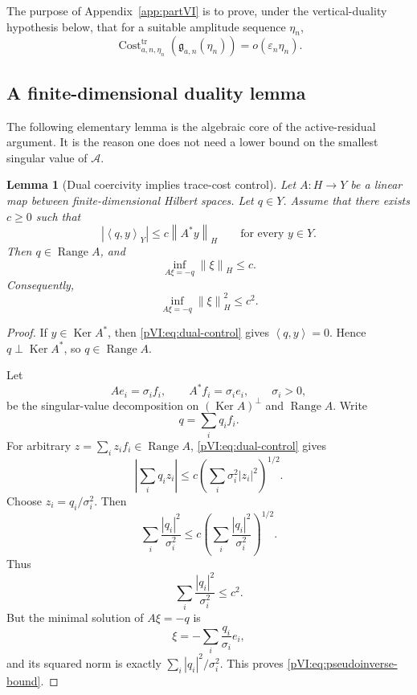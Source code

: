 \documentclass[11pt]{article}
\numberwithin{equation}{section}
\theoremstyle{plain}
\newtheorem{lemma}{Lemma}[section]
\theoremstyle{definition}
\theoremstyle{remark}
\DeclareMathOperator{\Range}{Range}
\DeclareMathOperator{\Ker}{Ker}
\DeclareMathOperator{\Cost}{Cost}
\newcommand{\eps}{\varepsilon}
\newcommand{\tr}{\operatorname{tr}}
\newcommand{\norm}[2]{\left\|#1\right\|_{#2}}
\newcommand{\inner}[2]{\left\langle #1,#2\right\rangle}
\newcommand{\calA}{\mathcal A}
\begin{document}
The purpose of Appendix~\ref{app:partVI} is to prove, under the vertical-duality hypothesis below, that for a suitable
amplitude sequence \(\eta_n\),
\begin{equation}\label{pVI:eq:desired-trace-cost}
        \Cost_{a,n,\eta_n}^{\tr}(\mathfrak g_{a,n}(\eta_n))
        =
        o(\eps_n\eta_n).
\end{equation}

\subsection{A finite-dimensional duality lemma}

The following elementary lemma is the algebraic core of the active-residual argument.  It is the
reason one does not need a lower bound on the smallest singular value of \(\calA\).

\begin{lemma}[Dual coercivity implies trace-cost control]\label{pVI:lem:dual-coercivity}
Let \(A:H\to Y\) be a linear map between finite-dimensional Hilbert spaces.  Let \(q\in Y\).
Assume that there exists \(c\ge0\) such that
\begin{equation}\label{pVI:eq:dual-control}
        |\inner{q}{y}_Y|
        \le
        c\norm{A^*y}{H}
        \qquad
        \text{for every }y\in Y.
\end{equation}
Then \(q\in\Range A\), and
\begin{equation}\label{pVI:eq:pseudoinverse-bound}
        \inf_{A\xi=-q}\norm{\xi}{H}
        \le
        c.
\end{equation}
Consequently,
\[
        \inf_{A\xi=-q}\norm{\xi}{H}^2\le c^2.
\]
\end{lemma}

\begin{proof}
If \(y\in\Ker A^*\), then \eqref{pVI:eq:dual-control} gives \(\inner{q}{y}=0\).  Hence
\(q\perp\Ker A^*\), so \(q\in\Range A\).

Let
\[
        Ae_i=\sigma_i f_i,
        \qquad
        A^*f_i=\sigma_i e_i,
        \qquad
        \sigma_i>0,
\]
be the singular-value decomposition on \((\Ker A)^\perp\) and \(\Range A\).  Write
\[
        q=\sum_i q_i f_i.
\]
For arbitrary \(z=\sum_i z_i f_i\in \Range A\), \eqref{pVI:eq:dual-control} gives
\[
        \left|\sum_i q_i z_i\right|
        \le
        c\left(\sum_i\sigma_i^2|z_i|^2\right)^{1/2}.
\]
Choose \(z_i=q_i/\sigma_i^2\).  Then
\[
        \sum_i\frac{|q_i|^2}{\sigma_i^2}
        \le
        c\left(\sum_i\frac{|q_i|^2}{\sigma_i^2}\right)^{1/2}.
\]
Thus
\[
        \sum_i\frac{|q_i|^2}{\sigma_i^2}\le c^2.
\]
But the minimal solution of \(A\xi=-q\) is
\[
        \xi=-\sum_i\frac{q_i}{\sigma_i}e_i,
\]
and its squared norm is exactly \(\sum_i |q_i|^2/\sigma_i^2\).  This proves
\eqref{pVI:eq:pseudoinverse-bound}.
\end{proof}
\end{document}
